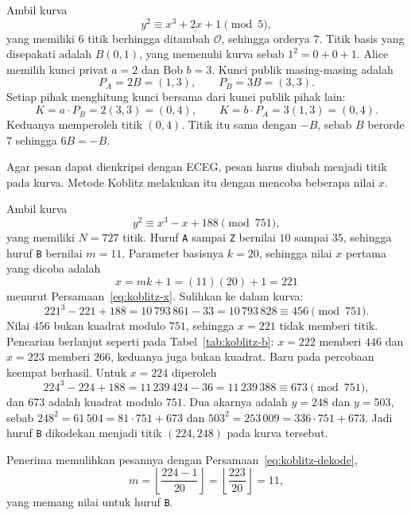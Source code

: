 \begin{example}
\label{ex:ecdh}
Ambil kurva
\[
y^2 \equiv x^3 + 2x + 1 \pmod{5},
\]
yang memiliki $6$ titik berhingga ditambah $\mathcal{O}$, sehingga orderya
$7$. Titik basis yang disepakati adalah $B(0, 1)$, yang memenuhi kurva sebab
$1^2 = 0 + 0 + 1$. Alice memilih kunci privat $a = 2$ dan Bob $b = 3$. Kunci
publik masing-masing adalah
\[
P_A = 2B = (1, 3),
\qquad
P_B = 3B = (3, 3).
\]
Setiap pihak menghitung kunci bersama dari kunci publik pihak lain:
\[
K = a \cdot P_B = 2(3, 3) = (0, 4),
\qquad
K = b \cdot P_A = 3(1, 3) = (0, 4) .
\]
Keduanya memperoleh titik $(0, 4)$. Titik itu sama dengan $-B$, sebab $B$
berorde $7$ sehingga $6B = -B$.
\end{example}

\begin{example}
\label{ex:koblitz}
Agar pesan dapat dienkripsi dengan ECEG, pesan harus diubah menjadi titik pada
kurva. Metode Koblitz melakukan itu dengan mencoba beberapa nilai $x$.

Ambil kurva
\[
y^2 \equiv x^3 - x + 188 \pmod{751},
\]
yang memiliki $N = 727$ titik. Huruf \texttt{A} sampai \texttt{Z} bernilai
$10$ sampai $35$, sehingga huruf \texttt{B} bernilai $m = 11$. Parameter
basisnya $k = 20$, sehingga nilai $x$ pertama yang dicoba adalah
\[
x = mk + 1 = (11)(20) + 1 = 221
\]
menurut Persamaan~\eqref{eq:koblitz-x}. Sulihkan ke dalam kurva:
\[
221^3 - 221 + 188 = 10\,793\,861 - 33 = 10\,793\,828
\equiv 456 \pmod{751} .
\]
Nilai $456$ bukan kuadrat modulo $751$, sehingga $x = 221$ tidak memberi titik.
Pencarian berlanjut seperti pada Tabel~\ref{tab:koblitz-b}: $x = 222$ memberi
$446$ dan $x = 223$ memberi $266$, keduanya juga bukan kuadrat. Baru pada
percobaan keempat berhasil. Untuk $x = 224$ diperoleh
\[
224^3 - 224 + 188 = 11\,239\,424 - 36 = 11\,239\,388
\equiv 673 \pmod{751} ,
\]
dan $673$ adalah kuadrat modulo $751$. Dua akarnya adalah $y = 248$ dan
$y = 503$, sebab $248^2 = 61\,504 = 81 \cdot 751 + 673$ dan
$503^2 = 253\,009 = 336 \cdot 751 + 673$. Jadi huruf \texttt{B} dikodekan
menjadi titik $(224, 248)$ pada kurva tersebut.

Penerima memulihkan pesannya dengan Persamaan~\eqref{eq:koblitz-dekode},
\[
m = \left\lfloor \frac{224 - 1}{20} \right\rfloor
  = \left\lfloor \frac{223}{20} \right\rfloor = 11 ,
\]
yang memang nilai untuk huruf \texttt{B}.
\end{example}
